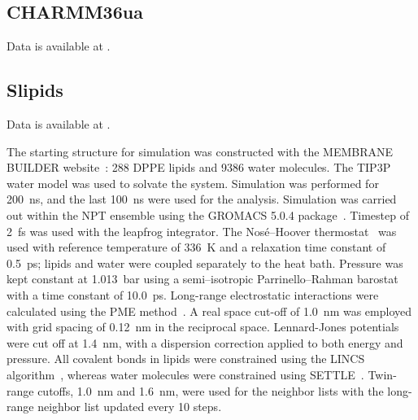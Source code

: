 \documentclass[journal=jpcbfk]{achemso}
\begin{document}
 

\subsection{CHARMM36ua}

 Data is available at \cite{charmm36uaPOPEfiles}. 



\subsection{Slipids}
 Data is available at \cite{slipidsPOPEfiles}. 

 

 The starting structure for simulation was constructed with the MEMBRANE BUILDER website~\cite{ghahremanpour13}: 288 DPPE lipids and 9386 water molecules. The TIP3P~\cite{jorgensen83} water model was used to solvate the system.
Simulation was performed for 200~ns, and the last 100~ns were used for the analysis. Simulation was carried out within the NPT ensemble using the GROMACS 5.0.4 package~\cite{abraham2015gromacs}. Timestep of 2~fs was used with the leapfrog integrator. The Nos\'{e}--Hoover thermostat~\cite{nose84,hoover85} was used with reference temperature of 336~K and a relaxation time constant of 0.5~ps; lipids and water were coupled separately to the heat bath. Pressure was kept constant at 1.013~bar using a semi--isotropic Parrinello--Rahman
barostat~\cite{parrinello81} with a time constant of 10.0~ps. Long-range electrostatic interactions were calculated using the PME method~\cite{darden93,essman95}. A real space cut-off of 1.0~nm was employed with grid spacing of 0.12~nm in the reciprocal space. Lennard-Jones potentials were cut off at 1.4~nm, with a dispersion correction applied to both energy and pressure. All covalent bonds in lipids were constrained using the LINCS algorithm~\cite{hess97}, whereas water molecules were constrained using SETTLE~\cite{miyamoto92}. Twin-range cutoffs, 1.0~nm and 1.6~nm, were used for the neighbor lists with the long-range neighbor list updated every 10 steps.
\end{document}
